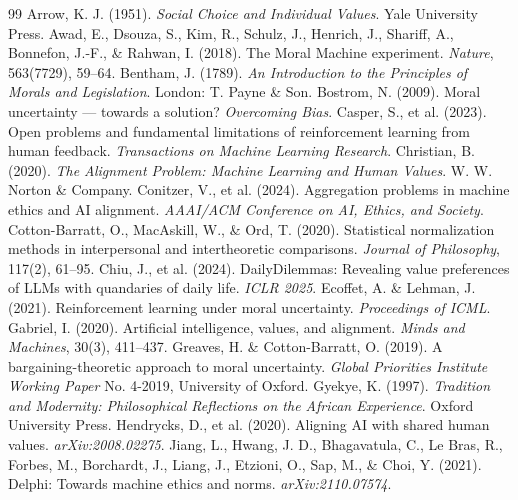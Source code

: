\documentclass[10pt,twocolumn,a4paper]{article}
\begin{document}
\label{sec:bib}
\begin{thebibliography}{99}
\footnotesize
{} Arrow, K. J. (1951). \textit{Social Choice and Individual Values}. Yale University Press.
 Awad, E., Dsouza, S., Kim, R., Schulz, J., Henrich, J., Shariff, A., Bonnefon, J.-F., \& Rahwan, I. (2018). The Moral Machine experiment. \textit{Nature}, 563(7729), 59--64.
 Bentham, J. (1789). \textit{An Introduction to the Principles of Morals and Legislation}. London: T. Payne \& Son.
 Bostrom, N. (2009). Moral uncertainty --- towards a solution? \textit{Overcoming Bias}.
 Casper, S., et al. (2023). Open problems and fundamental limitations of reinforcement learning from human feedback. \textit{Transactions on Machine Learning Research}.
 Christian, B. (2020). \textit{The Alignment Problem: Machine Learning and Human Values}. W. W. Norton \& Company.
 Conitzer, V., et al. (2024). Aggregation problems in machine ethics and AI alignment. \textit{AAAI/ACM Conference on AI, Ethics, and Society}.
 Cotton-Barratt, O., MacAskill, W., \& Ord, T. (2020). Statistical normalization methods in interpersonal and intertheoretic comparisons. \textit{Journal of Philosophy}, 117(2), 61--95.
 Chiu, J., et al. (2024). DailyDilemmas: Revealing value preferences of LLMs with quandaries of daily life. \textit{ICLR 2025}.
 Ecoffet, A. \& Lehman, J. (2021). Reinforcement learning under moral uncertainty. \textit{Proceedings of ICML}.
 Gabriel, I. (2020). Artificial intelligence, values, and alignment. \textit{Minds and Machines}, 30(3), 411--437.
 Greaves, H. \& Cotton-Barratt, O. (2019). A bargaining-theoretic approach to moral uncertainty. \textit{Global Priorities Institute Working Paper} No. 4-2019, University of Oxford.
 Gyekye, K. (1997). \textit{Tradition and Modernity: Philosophical Reflections on the African Experience}. Oxford University Press.
 Hendrycks, D., et al. (2020). Aligning AI with shared human values. \textit{arXiv:2008.02275}.
 Jiang, L., Hwang, J. D., Bhagavatula, C., Le Bras, R., Forbes, M., Borchardt, J., Liang, J., Etzioni, O., Sap, M., \& Choi, Y. (2021). Delphi: Towards machine ethics and norms. \textit{arXiv:2110.07574}.

\end{thebibliography}
\end{document}
